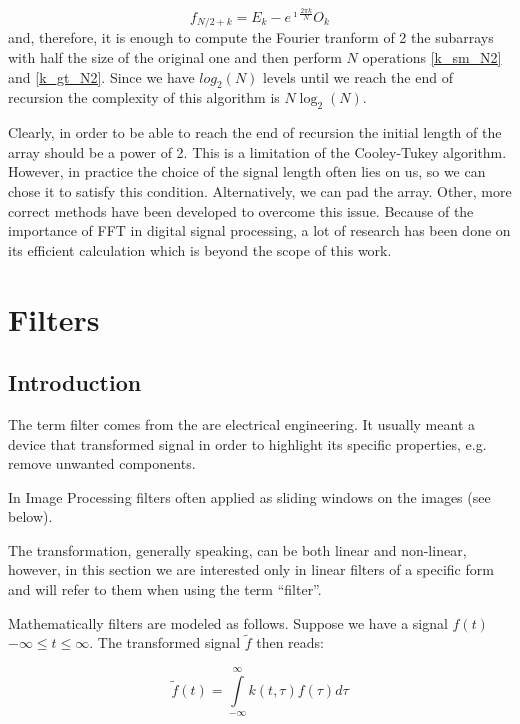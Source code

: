 \documentclass[11pt]{book}
\begin{document}
\begin{equation}
 f_{N/2+k} =  E_{k} - e^{\imath \frac{2 \pi k}{N}} O_k \label{k_gt_N2}
\end{equation}
and, therefore, it is enough to compute the Fourier tranform of 2 the subarrays with half the size of the original one and then perform $N$
operations \eqref{k_sm_N2} and \eqref{k_gt_N2}. Since we have $log_2(N)$ levels until we reach the end of recursion the complexity of this algorithm is $N\operatorname{log}_2(N)$. 


Clearly, in order to be able to reach the end of recursion the initial length of the array should be a power of 2. This is a limitation of the Cooley-Tukey algorithm. However, in practice the choice of the signal length often lies on us, so we can chose it to satisfy this condition. Alternatively, we can pad the array. Other, more correct methods have been developed to overcome this issue. Because of the importance of FFT in digital signal processing, a lot of research has been done on its efficient calculation which is beyond the scope of this work. 

\section{Filters}

\subsection{Introduction}

The term filter comes from the are electrical engineering. It usually meant a device that transformed signal in order to highlight its specific properties, e.g. remove unwanted components.

In Image Processing filters often applied as sliding windows on the images (see below). 


The transformation, generally speaking,  can be both linear and non-linear, however, in this section we are interested only in linear filters of a specific form and will refer to them when using the term ``filter''.

Mathematically  filters are modeled as follows. Suppose we have a signal $f(t)$ $-\infty \leq t \leq \infty$. The transformed signal $\tilde{f}$ then reads:

\begin{equation}
 \tilde{f}(t) = \int\limits_{-\infty}^\infty k(t,\tau) f(\tau) d\tau\label{filter_continous}
\end{equation}
\end{document}
